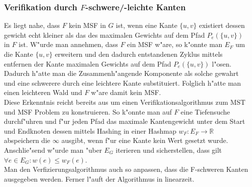 \subsubsection{Verifikation durch $F$-schwere/-leichte Kanten}
\label{sec:verification}
Es liegt nahe, dass $F$ kein MSF in $G$ ist, wenn eine Kante $\{u,v\}$ 
    existiert dessen gewicht echt kleiner als das des maximalen Gewichts auf dem
    Pfad $P_e(\{u,v\})$ in $F$ ist. W"urde man annehmen, dass $F$ ein MSF w"are, 
    so k"onnte man $E_F$ um die Kante $\{u,v\}$ erweitern und den dadurch 
    entstandenen Zyklus mittels entfernen der Kante maximalen Gewichts auf dem
    Pfad $P_e(\{u,v\})$ l"osen. Dadurch h"atte man die Zusammenh"angende 
    Komponente als solche gewahrt und eine schwerere durch eine leichtere Kante
    substituiert. Folglich h"atte man einen leichteren Wald und $F$ w"are damit
    kein MSF.\\
Diese Erkenntnis reicht bereits aus um einen Verifikationsalgorithmus zum 
    MST und MSF Problem zu konstruieren.
    So k"onnte man auf $F$ eine Tiefensuche durchf"uhren und f"ur jeden Pfad 
    das maximale Kantengewicht unter dem Start und Endknoten dessen mittels
    Hashing in einer Hashmap $w_F : E_F \rightarrow \mathbb{R}$ abspeichern die 
    $\infty$ ausgibt, wenn f"ur eine Kante kein Wert gesetzt wurde.
    Anschlie"send w"urde man "uber $E_G$ iterieren und sicherstellen, dass gilt
    $\forall e \in E_G: w(e) \leq w_F(e)$.\\
Man den Verfizierungsalgorithmus auch so anpassen, dass die F-schweren Kanten
    ausgegeben werden.
    Ferner l"auft der Algorithmus in linearzeit.\\
